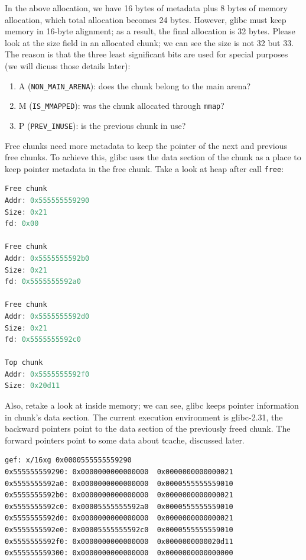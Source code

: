 \documentclass{masterthesis}
\newcommand*\libc{glibc}
\newcommand*\tch{tcache}
\newcommand*\mmapc{\lstinline{mmap}\xspace}
\begin{document}
In the above allocation, we have 16 bytes of metadata plus 8 bytes of memory allocation, which total allocation becomes 24 bytes. However, \libc{} must keep memory in 16-byte alignment; as a result, the final allocation is 32 bytes. Please look at the size field in an allocated chunk; we can see the size is not 32 but 33. The reason is that the three least significant bits are used for special purposes (we will dicuss those details later):
\begin{enumerate}
	\item A (\lstinline{NON_MAIN_ARENA}): does the chunk belong to the main arena?
	\item M (\lstinline{IS_MMAPPED}): was the chunk allocated through \mmapc{}?
	\item P (\lstinline{PREV_INUSE}): is the previous chunk in use?
\end{enumerate}
Free chunks need more metadata to keep the pointer of the next and previous free chunks. To achieve this, \libc{} uses the data section of the chunk as a place to keep pointer metadata in the free chunk. Take a look at heap after call \lstinline{free}:

\begin{lstlisting}[language=c,frame=tlrb]
Free chunk
Addr: 0x555555559290
Size: 0x21
fd: 0x00

Free chunk
Addr: 0x5555555592b0
Size: 0x21
fd: 0x5555555592a0

Free chunk
Addr: 0x5555555592d0
Size: 0x21
fd: 0x5555555592c0

Top chunk
Addr: 0x5555555592f0
Size: 0x20d11
\end{lstlisting}

Also, retake a look at inside memory; we can see, \libc{} keeps pointer information in chunk's data section. The current execution environment is \libc{-2.31}, the backward pointers point to the data section of the previously freed chunk. The forward pointers point to some data about \tch{}, discussed later.

\begin{lstlisting}[frame=tlrb]
gef: x/16xg 0x0000555555559290
0x555555559290:	0x0000000000000000	0x0000000000000021
0x5555555592a0:	0x0000000000000000	0x0000555555559010
0x5555555592b0:	0x0000000000000000	0x0000000000000021
0x5555555592c0:	0x00005555555592a0	0x0000555555559010
0x5555555592d0:	0x0000000000000000	0x0000000000000021
0x5555555592e0:	0x00005555555592c0	0x0000555555559010
0x5555555592f0:	0x0000000000000000	0x0000000000020d11
0x555555559300:	0x0000000000000000	0x0000000000000000
\end{lstlisting}
\end{document}
